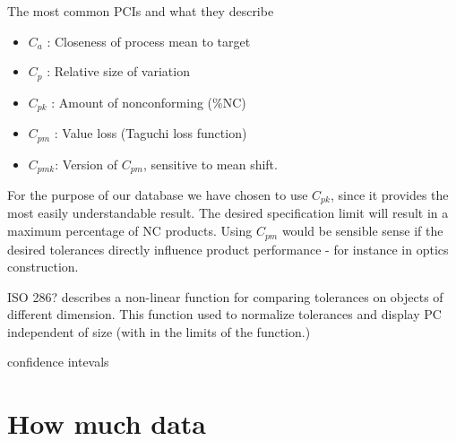 \documentclass[aip,amsmath, reprint, author-year]{revtex4-1}
\begin{document}
The most common PCIs and what they describe \citep{wu2009overview, taguchi1986introduction}
\begin{itemize}
	\item $C_a$ : Closeness of process mean to target 
	\item $C_p$ : Relative size of variation
	\item $C_{pk}$ : Amount of nonconforming (\%NC)
	\item $C_{pm}$ : Value loss (Taguchi loss function)
	\item $C_{pmk}$: Version of $C_{pm}$,  sensitive to mean shift. 
\end{itemize}

For the purpose of our database we have chosen to use $C_{pk}$, since it provides the most easily understandable result. The desired specification limit will result in a maximum percentage of NC products. Using $C_{pm}$ would be sensible sense if the desired tolerances directly influence product performance - for instance in optics construction.  




\cite{tang1997graphical}


ISO 286? describes a non-linear function for comparing tolerances on objects of different dimension. This function used to normalize tolerances and display PC independent of size (with in the limits of the function.)  

confidence intevals

\section{How much data}
\end{document}
